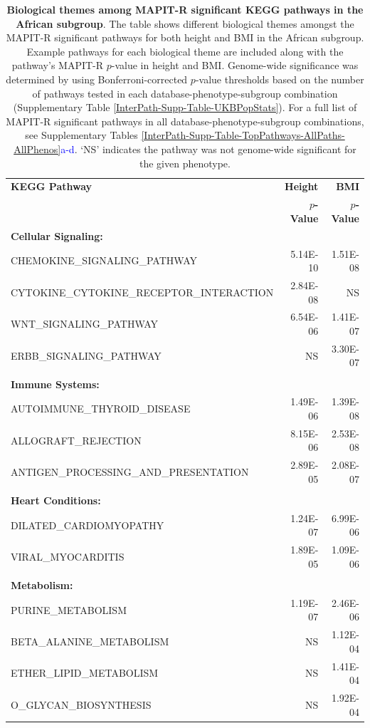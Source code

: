 \documentclass[10pt,a4paper]{article}
\begin{document}
\begin{table}[ht]
\centering
\begin{tabular}{lrr}
  \hline
\textbf{KEGG Pathway} & \textbf{Height} & \textbf{BMI} \\ 
& \textbf{$p$-Value} & \textbf{$p$-Value} \\ 
  \hline
  \textbf{Cellular Signaling:} & & \\
 CHEMOKINE\_SIGNALING\_PATHWAY & 5.14E-10 & 1.51E-08 \\
 CYTOKINE\_CYTOKINE\_RECEPTOR\_INTERACTION & 2.84E-08 & NS \\
 WNT\_SIGNALING\_PATHWAY & 6.54E-06 & 1.41E-07 \\
 ERBB\_SIGNALING\_PATHWAY & NS & 3.30E-07 \\
  \\
  \textbf{Immune Systems:} & & \\
  AUTOIMMUNE\_THYROID\_DISEASE & 1.49E-06 & 1.39E-08 \\
  ALLOGRAFT\_REJECTION & 8.15E-06 & 2.53E-08 \\
  ANTIGEN\_PROCESSING\_AND\_PRESENTATION & 2.89E-05 & 2.08E-07 \\
  \\
  \textbf{Heart Conditions:} & & \\
  DILATED\_CARDIOMYOPATHY & 1.24E-07 & 6.99E-06 \\
  VIRAL\_MYOCARDITIS & 1.89E-05 & 1.09E-06 \\
  \\
  \textbf{Metabolism:} & & \\
  PURINE\_METABOLISM & 1.19E-07 & 2.46E-06 \\
  BETA\_ALANINE\_METABOLISM & NS & 1.12E-04 \\
  ETHER\_LIPID\_METABOLISM & NS & 1.41E-04 \\
  O\_GLYCAN\_BIOSYNTHESIS & NS & 1.92E-04 \\
   \hline
\end{tabular}
  \caption{\textbf{Biological themes among MAPIT-R significant KEGG pathways in the African subgroup}. The table shows different biological themes amongst the MAPIT-R significant pathways for both height and BMI in the African subgroup. Example pathways for each biological theme are included along with the pathway's MAPIT-R $p$-value in height and BMI. Genome-wide significance was determined by using Bonferroni-corrected $p$-value thresholds based on the number of pathways tested in each database-phenotype-subgroup combination (Supplementary Table \ref{InterPath-Supp-Table-UKBPopStats}). For a full list of MAPIT-R significant pathways in all database-phenotype-subgroup combinations, see Supplementary Tables \ref{InterPath-Supp-Table-TopPathways-AllPaths-AllPhenos}\textcolor{blue}{a-d}. `NS' indicates the pathway was not genome-wide significant for the given phenotype.}
\label{InterPath-Main-Table-KEGG-African-TopPathways-Themes}
\end{table}
\end{document}
